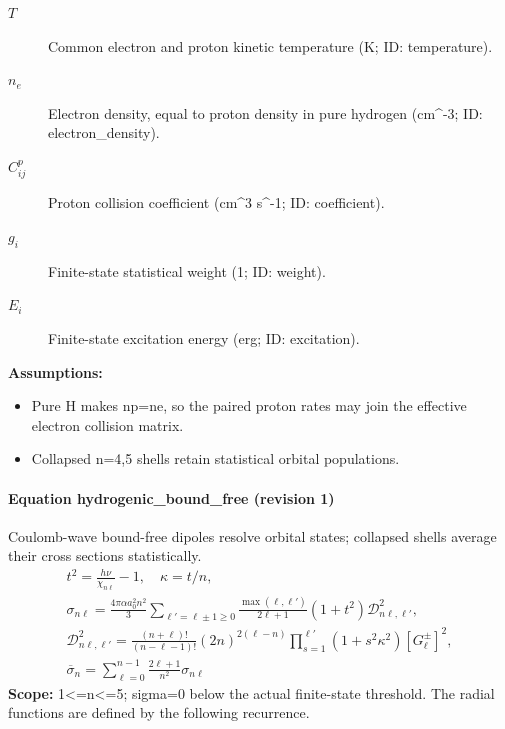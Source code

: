 \begin{description}
\item[$T$] Common electron and proton kinetic temperature (K; ID: temperature).
\item[$n_e$] Electron density, equal to proton density in pure hydrogen (cm\textasciicircum{}-3; ID: electron\_density).
\item[$C^p_{ij}$] Proton collision coefficient (cm\textasciicircum{}3 s\textasciicircum{}-1; ID: coefficient).
\item[$g_i$] Finite-state statistical weight (1; ID: weight).
\item[$E_i$] Finite-state excitation energy (erg; ID: excitation).
\end{description}

\noindent\textbf{Assumptions:}
\begin{itemize}
\item Pure H makes np=ne, so the paired proton rates may join the effective electron collision matrix.
\item Collapsed n=4,5 shells retain statistical orbital populations.
\end{itemize}

\paragraph{Equation hydrogenic\_bound\_free (revision 1)}
Coulomb-wave bound-free dipoles resolve orbital states; collapsed shells average their cross sections statistically.
\begin{equation}
\begin{aligned}
t^2=\frac{h\nu}{\chi_{n\ell}}-1,\quad \kappa=t/n,\\
\sigma_{n\ell}=\frac{4\pi\alpha a_0^2n^2}{3}
\sum_{\ell'=\ell\pm1\ge0}\frac{\max(\ell,\ell')}{2\ell+1}(1+t^2)
\mathcal D_{n\ell,\ell'}^2,\\
\mathcal D_{n\ell,\ell'}^2=\frac{(n+\ell)!}{(n-\ell-1)!}(2n)^{2(\ell-n)}
\prod_{s=1}^{\ell'}(1+s^2\kappa^2)[G_\ell^{\pm}]^2,\\
\overline\sigma_n=\sum_{\ell=0}^{n-1}\frac{2\ell+1}{n^2}\sigma_{n\ell}
\end{aligned}
\label{eq:escape.cloudy_5f_investigation:hydrogenic_5f_bound_5f_free:1}
\end{equation}
\noindent\textbf{Scope:} 1<=n<=5; sigma=0 below the actual finite-state threshold. The radial functions are defined by the following recurrence.

